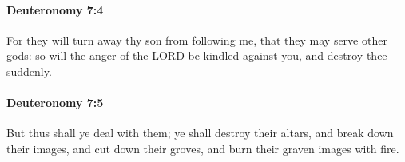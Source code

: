 		\paragraph{Deuteronomy 7:4} %
			\label{DEUTERONOMY-7-4}

			For they will turn away thy son from following me, that they may serve other gods: so will the anger of the LORD be kindled against you, and destroy thee suddenly.


		\paragraph{Deuteronomy 7:5} %
			\label{DEUTERONOMY-7-5}

			But thus shall ye deal with them; ye shall destroy their altars, and break down their images, and cut down their groves, and burn their graven images with fire.


